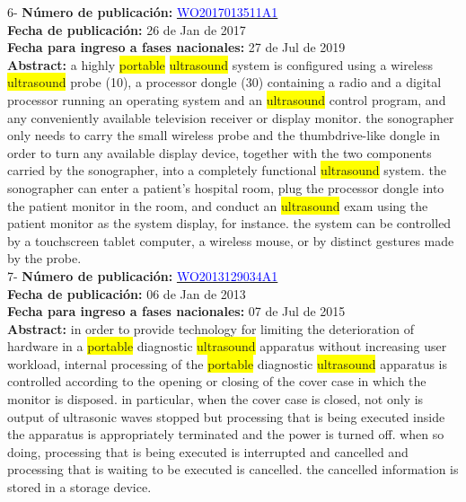  \vspace{1cm}6- \textbf{Número de publicación:} \href{https://worldwide.espacenet.com/publicationDetails/biblio?DB=EPODOC&II=0&ND=3&adjacent=true&locale=en_EP&FT=D&date=20160331&CC=WO&NR=2017013511A1&KC=A1#}{\textcolor{blue}{WO2017013511A1}}\\ 
\textbf{Fecha de publicación:} 26 de Jan de 2017\\ 
\textbf{Fecha para ingreso a fases nacionales:} 27 de Jul de 2019\\ 
\textbf{Abstract:} a highly \colorbox{yellow}{\colorbox{yellow}{portable}} \colorbox{yellow}{ultrasound} system is configured using a wireless \colorbox{yellow}{ultrasound} probe (10), a processor dongle (30) containing a radio and a digital processor running an operating system and an \colorbox{yellow}{ultrasound} control program, and any conveniently available television receiver or display monitor. the sonographer only needs to carry the small wireless probe and the thumbdrive-like dongle in order to turn any available display device, together with the two components carried by the sonographer, into a completely functional \colorbox{yellow}{ultrasound} system. the sonographer can enter a patient's hospital room, plug the processor dongle into the patient monitor in the room, and conduct an \colorbox{yellow}{ultrasound} exam using the patient monitor as the system display, for instance. the system can be controlled by a touchscreen tablet computer, a wireless mouse, or by distinct gestures made by the probe.\\ 
 

 \vspace{1cm}7- \textbf{Número de publicación:} \href{https://worldwide.espacenet.com/publicationDetails/biblio?DB=EPODOC&II=0&ND=3&adjacent=true&locale=en_EP&FT=D&date=20160331&CC=WO&NR=2013129034A1&KC=A1#}{\textcolor{blue}{WO2013129034A1}}\\ 
\textbf{Fecha de publicación:} 06 de Jan de 2013\\ 
\textbf{Fecha para ingreso a fases nacionales:} 07 de Jul de 2015\\ 
\textbf{Abstract:} in order to provide technology for limiting the deterioration of hardware in a \colorbox{yellow}{\colorbox{yellow}{portable}} diagnostic \colorbox{yellow}{ultrasound} apparatus without increasing user workload, internal processing of the \colorbox{yellow}{\colorbox{yellow}{portable}} diagnostic \colorbox{yellow}{ultrasound} apparatus is controlled according to the opening or closing of the cover case in which the monitor is disposed. in particular, when the cover case is closed, not only is output of ultrasonic waves stopped but processing that is being executed inside the apparatus is appropriately terminated and the power is turned off. when so doing, processing that is being executed is interrupted and cancelled and processing that is waiting to be executed is cancelled. the cancelled information is stored in a storage device.\\ 
 

